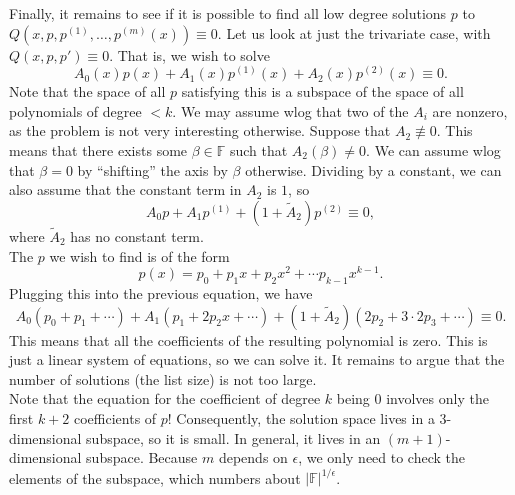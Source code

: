 \documentclass{article}
\newcommand{\F}{\mathbb{F}}
\begin{document}
	Finally, it remains to see if it is possible to find all low degree solutions $p$ to $Q(x,p,p^{(1)},\ldots,p^{(m)}(x)) \equiv 0$. Let us look at just the trivariate case, with $Q(x,p,p') \equiv 0$. That is, we wish to solve
	\[ A_0(x) p(x) + A_1(x) p^{(1)}(x) + A_2(x) p^{(2)}(x) \equiv 0. \]
	Note that the space of all $p$ satisfying this is a subspace of the space of all polynomials of degree $<k$. We may assume wlog that two of the $A_i$ are nonzero, as the problem is not very interesting otherwise. Suppose that $A_2 \not\equiv 0$. This means that there exists some $\beta \in \F$ such that $A_2(\beta) \ne 0$. We can assume wlog that $\beta = 0$ by ``shifting'' the axis by $\beta$ otherwise. Dividing by a constant, we can also assume that the constant term in $A_2$ is $1$, so
	\[ A_0p + A_1p^{(1)} + (1 + \tilde{A}_2)p^{(2)} \equiv 0, \]
	where $\tilde{A}_2$ has no constant term.\\
	The $p$ we wish to find is of the form
	\[ p(x) = p_0 + p_1x + p_2x^2 + \cdots p_{k-1}x^{k-1}. \]
	Plugging this into the previous equation, we have
	\[ A_0(p_0 + p_1 + \cdots) + A_1(p_1 + 2p_2x + \cdots) + (1+\tilde{A}_2)(2p_2 + 3\cdot 2p_3 + \cdots) \equiv 0. \]
	This means that all the coefficients of the resulting polynomial is zero. This is just a linear system of equations, so we can solve it. It remains to argue that the number of solutions (the list size) is not too large.\\
	Note that the equation for the coefficient of degree $k$ being $0$ involves only the first $k+2$ coefficients of $p$! Consequently, the solution space lives in a $3$-dimensional subspace, so it is small. In general, it lives in an $(m+1)$-dimensional subspace. Because $m$ depends on $\epsilon$, we only need to check the elements of the subspace, which numbers about $|\F|^{1/\epsilon}$.


\end{document}
